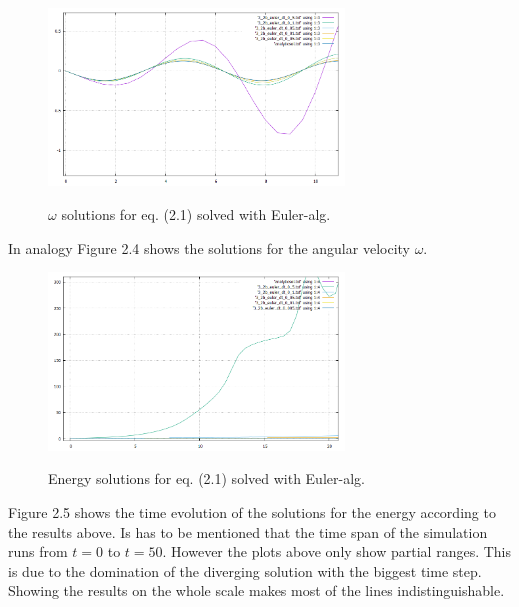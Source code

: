 \documentclass[12pt,a4paper]{article}	%
\begin{document}
\begin{figure}[h!]		
\centering
{\includegraphics[width=0.7\textwidth]{3_2_b_omegaplots.png}}		
\caption{$\omega$ solutions for eq. (2.1) solved with Euler-alg.}
\end{figure}

In analogy Figure 2.4 shows the solutions for the angular velocity $\omega$.
\newpage


\begin{figure}[h!]		
\centering
{\includegraphics[width=0.7\textwidth]{3_2_b_enplot.png}}		
\caption{Energy solutions for eq. (2.1) solved with Euler-alg.}
\end{figure}



Figure 2.5 shows the time evolution of the solutions for the energy according to the results above. Is has to be mentioned that the time span of the simulation runs from $t=0$ to $t = 50$. However the plots above only show partial ranges. This is due to the domination of the diverging solution with the biggest time step. Showing the results on the whole scale makes most of the lines indistinguishable. 


\newpage
\end{document}
